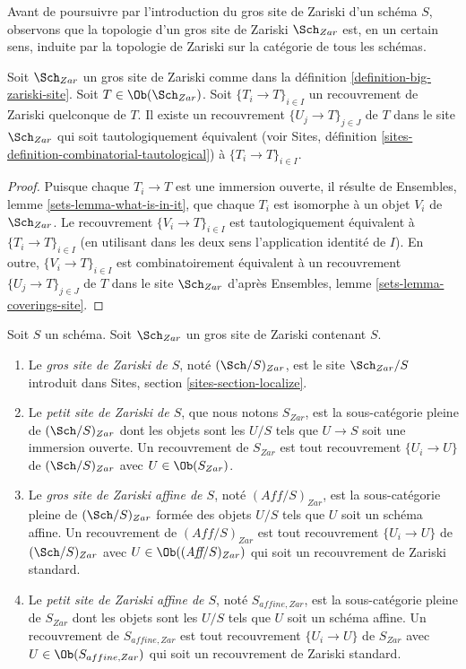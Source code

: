 \medskip\noindent
Avant de poursuivre par l'introduction du gros site de Zariski d'un
schéma $S$, observons que la topologie d'un gros site de Zariski
$\Sch_{Zar}$ est, en un certain sens, induite par la topologie de Zariski
sur la catégorie de tous les schémas.

\begin{lemma}
\label{lemma-zariski-induced}
Soit $\Sch_{Zar}$ un gros site de Zariski comme dans la
définition \ref{definition-big-zariski-site}.
Soit $T \in \Ob(\Sch_{Zar})$.
Soit $\{T_i \to T\}_{i \in I}$ un recouvrement de Zariski quelconque de $T$.
Il existe un recouvrement $\{U_j \to T\}_{j \in J}$ de $T$ dans le site
$\Sch_{Zar}$ qui soit tautologiquement équivalent (voir
Sites, définition \ref{sites-definition-combinatorial-tautological})
à $\{T_i \to T\}_{i \in I}$.
\end{lemma}

\begin{proof}
Puisque chaque $T_i \to T$ est une immersion ouverte, il résulte de
Ensembles, lemme \ref{sets-lemma-what-is-in-it},
que chaque $T_i$ est isomorphe à un objet $V_i$ de $\Sch_{Zar}$.
Le recouvrement $\{V_i \to T\}_{i \in I}$ est tautologiquement équivalent
à $\{T_i \to T\}_{i \in I}$ (en utilisant dans les deux sens l'application identité de $I$).
En outre, $\{V_i \to T\}_{i \in I}$ est combinatoirement équivalent à un
recouvrement $\{U_j \to T\}_{j \in J}$ de $T$ dans le site $\Sch_{Zar}$ d'après
Ensembles, lemme \ref{sets-lemma-coverings-site}.
\end{proof}

\begin{definition}
\label{definition-big-small-Zariski}
Soit $S$ un schéma. Soit $\Sch_{Zar}$ un gros site de Zariski
contenant $S$.
\begin{enumerate}
\item Le {\it gros site de Zariski de $S$}, noté
$(\Sch/S)_{Zar}$, est le site $\Sch_{Zar}/S$
introduit dans Sites, section \ref{sites-section-localize}.
\item Le {\it petit site de Zariski de $S$}, que nous notons
$S_{Zar}$, est la sous-catégorie pleine de $(\Sch/S)_{Zar}$
dont les objets sont les $U/S$ tels que $U \to S$ soit une immersion ouverte.
Un recouvrement de $S_{Zar}$ est tout recouvrement $\{U_i \to U\}$ de
$(\Sch/S)_{Zar}$ avec $U \in \Ob(S_{Zar})$.
\item Le {\it gros site de Zariski affine de $S$}, noté
$(\textit{Aff}/S)_{Zar}$, est la sous-catégorie pleine de
$(\Sch/S)_{Zar}$ formée des objets $U/S$ tels que $U$ soit un
schéma affine. Un recouvrement de $(\textit{Aff}/S)_{Zar}$ est tout recouvrement
$\{U_i \to U\}$ de $(\Sch/S)_{Zar}$ avec $U \in \Ob((\textit{Aff}/S)_{Zar})$
qui soit un recouvrement de Zariski standard.
\item Le {\it petit site de Zariski affine de $S$}, noté
$S_{affine, Zar}$, est la sous-catégorie pleine de $S_{Zar}$
dont les objets sont les $U/S$ tels que $U$ soit un schéma affine.
Un recouvrement de $S_{affine, Zar}$ est tout recouvrement $\{U_i \to U\}$ de
$S_{Zar}$ avec $U \in \Ob(S_{affine, Zar})$
qui soit un recouvrement de Zariski standard.
\end{enumerate}
\end{definition}

